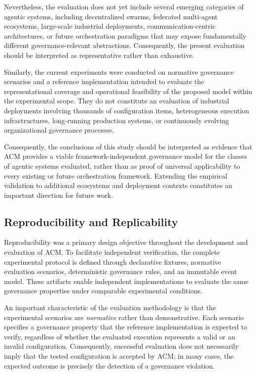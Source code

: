 \documentclass[10pt]{article}
\begin{document}
Nevertheless, the evaluation does not yet include several emerging categories of agentic systems, including decentralized swarms, federated multi-agent ecosystems, large-scale industrial deployments, communication-centric architectures, or future orchestration paradigms that may expose fundamentally different governance-relevant abstractions. Consequently, the present evaluation should be interpreted as representative rather than exhaustive.

Similarly, the current experiments were conducted on normative governance scenarios and a reference implementation intended to evaluate the representational coverage and operational feasibility of the proposed model within the experimental scope.
They do not constitute an evaluation of industrial deployments involving thousands of configuration items, heterogeneous execution infrastructures, long-running production systems, or continuously evolving organizational governance processes.

Consequently, the conclusions of this study should be interpreted as evidence that ACM provides a viable framework-independent governance model for the classes of agentic systems evaluated, rather than as proof of universal applicability to every existing or future orchestration framework. Extending the empirical validation to additional ecosystems and deployment contexts constitutes an important direction for future work.

\subsection{Reproducibility and Replicability}
\label{subsec:reproducibility}

Reproducibility was a primary design objective throughout the development and evaluation of ACM. To facilitate independent verification, the complete experimental protocol is defined through declarative fixtures, normative evaluation scenarios, deterministic governance rules, and an immutable event model. These artifacts enable independent implementations to evaluate the same governance properties under comparable experimental conditions.

An important characteristic of the evaluation methodology is that the
experimental scenarios are \emph{normative} rather than demonstrative. Each scenario specifies a governance property that the reference implementation is expected to verify, regardless of whether the evaluated execution represents a valid or an invalid configuration. Consequently, successful evaluation does not necessarily imply that the tested configuration is accepted by ACM; in many cases, the expected outcome is precisely the detection of a governance
violation.
\end{document}
